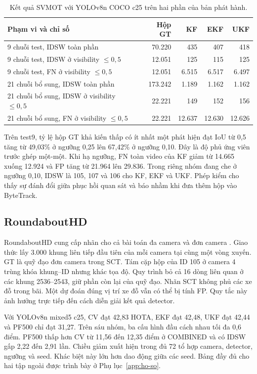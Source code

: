 \begin{table}[htbp]\centering\small
\caption{Kết quả SVMOT với YOLOv8n COCO c25 trên hai phần của bản phát hành.}\label{tab:svmot-vis}
\begin{tabularx}{\linewidth}{@{}Xrrrr@{}}\toprule
Phạm vi và chỉ số & Hộp GT & KF & EKF & UKF\\\midrule
9 chuỗi test, IDSW toàn phần & 70.220 & 435 & 407 & 418\\
9 chuỗi test, IDSW ở visibility $\leq0{,}5$ & 12.051 & 125 & 115 & 125\\
9 chuỗi test, FN ở visibility $\leq0{,}5$ & 12.051 & 6.515 & 6.517 & 6.497\\
21 chuỗi bổ sung, IDSW toàn phần & 173.242 & 1.189 & 1.162 & 1.162\\
21 chuỗi bổ sung, IDSW ở visibility $\leq0{,}5$ & 22.221 & 149 & 152 & 156\\
21 chuỗi bổ sung, FN ở visibility $\leq0{,}5$ & 22.221 & 12.637 & 12.630 & 12.626\\\bottomrule
\end{tabularx}
\end{table}

Trên test9, tỷ lệ hộp GT khả kiến thấp có ít nhất một phát hiện đạt IoU từ 0,5 tăng từ 49,03\% ở ngưỡng 0,25 lên 67,42\% ở ngưỡng 0,10. Đây là độ phủ ứng viên trước ghép một-một. Khi hạ ngưỡng, FN toàn video của KF giảm từ 14.665 xuống 12.924 và FP tăng từ 21.964 lên 29.836. Trong riêng nhóm đang che ở ngưỡng 0,10, IDSW là 105, 107 và 106 cho KF, EKF và UKF. Phép kiểm cho thấy sự đánh đổi giữa phục hồi quan sát và báo nhầm khi đưa thêm hộp vào ByteTrack.

\subsection{RoundaboutHD}
RoundaboutHD cung cấp nhãn cho cả bài toán đa camera và đơn camera \cite{round}. Giao thức lấy 3.000 khung liên tiếp đầu tiên của mỗi camera tại cùng một vòng xuyến. GT là quỹ đạo đơn camera trong SCT. Tám cặp hộp của ID 105 ở camera 4 trùng khóa khung--ID nhưng khác tọa độ. Quy trình bỏ cả 16 dòng liên quan ở các khung 2536--2543, giữ phần còn lại của quỹ đạo. Nhãn SCT không phủ các xe đỗ trong bãi. Một dự đoán đúng vị trí xe đỗ vẫn có thể bị tính FP. Quy tắc này ảnh hưởng trực tiếp đến cách diễn giải kết quả detector.

Với YOLOv8n mixed5 c25, CV đạt 42,83 HOTA, EKF đạt 42,48, UKF đạt 42,44 và PF500 chỉ đạt 31,27. Trên sáu nhóm, ba cấu hình đầu cách nhau tối đa 0,6 điểm. PF500 thấp hơn CV từ 11,56 đến 12,35 điểm ở COMBINED và có IDSW gấp 2,22 đến 2,91 lần. Chiều giảm xuất hiện trong đủ 72 tổ hợp camera, detector, ngưỡng và seed. Khác biệt này lớn hơn dao động giữa các seed. Bảng đầy đủ cho hai tập ngoài được trình bày ở Phụ lục~\ref{app:ho-so}.

